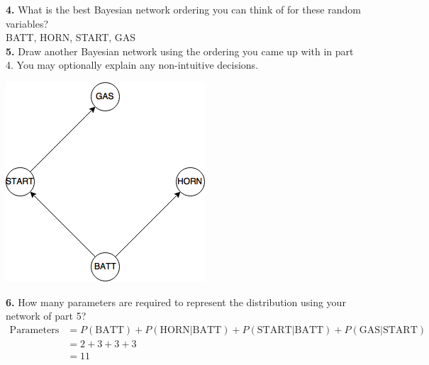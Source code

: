 \documentclass[titlepage]{article}
\begin{document}
\pagebreak

\noindent \textbf{4. } What is the best Bayesian network ordering you can think of for these random variables?\\

BATT, HORN, START, GAS\\

\noindent \textbf{5. } Draw another Bayesian network using the ordering you came up with in part 4. You may optionally explain any non-intuitive decisions.\\

\centerline{\includegraphics[scale=0.5]{25.png}}

\noindent \textbf{6. } How many parameters are required to represent the distribution using your network of part 5?\\
\begin{equation*}
\begin{aligned}
\text{Parameters} &= P(\text{BATT})+P(\text{HORN$|$BATT})+P(\text{START$|$BATT})+P(\text{GAS$|$START})\\
				  &= 2+3+3+3\\
				  &= 11
\end{aligned}
\end{equation*}
\end{document}

